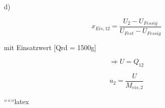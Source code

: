 d)

\[
x_{Eis,12} = \frac{U_2 - U_{Fessig}}{U_{Fest} - U_{Fessig}}
\]

mit Einsatzwert [Qrd = 1500g]

\[
\Rightarrow U = Q_{12}
\]

\[
u_2 = \frac{U}{M_{eis,2}}
\]

``````latex